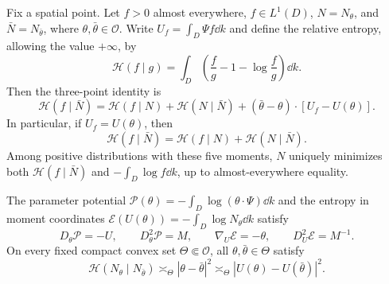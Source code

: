 \begin{proposition}\label{hyd:entropy-geometry}
 Fix a spatial point. Let $f>0$ almost everywhere, $f\in L^1(D)$,
 $N=N_\theta$, and $\bar N=N_{\bar\theta}$, where
 $\theta,\bar\theta\in\mathcal O$.
 Write $U_f=\int_D\Psi f\dd k$ and define the relative entropy, allowing
 the value $+\infty$, by
 \[
 \mathscr H(f\mid g)=\int_D\left(\frac f g-1-\log\frac f g\right)\dd k.
 \]
 Then the three-point identity is
 \begin{equation}\label{hyd:entropy-threepoint}
 \mathscr H(f\mid\bar N)
 =\mathscr H(f\mid N)+\mathscr H(N\mid\bar N)
       +(\bar\theta-\theta)\cdot[U_f-U(\theta)].
 \end{equation}
 In particular, if $U_f=U(\theta)$, then
 \begin{equation}\label{hyd:entropy-pythagoras}
 \mathscr H(f\mid\bar N)
       =\mathscr H(f\mid N)+\mathscr H(N\mid\bar N).
 \end{equation}
 Among positive distributions with these five moments, $N$ uniquely
 minimizes both $\mathscr H(f\mid\bar N)$ and
 $-\int_D\log f\dd k$, up to almost-everywhere equality.

 The parameter potential
 $\mathcal P(\theta)=-\int_D\log(\theta\cdot\Psi)\dd k$ and the entropy
 in moment coordinates
 $\mathcal E(U(\theta))=-\int_D\log N_\theta\dd k$ satisfy
 \begin{equation}\label{hyd:entropy-hessians}
 D_\theta\mathcal P=-U,\qquad D_\theta^2\mathcal P=M,
 \qquad \nabla_U\mathcal E=-\theta,\qquad D_U^2\mathcal E=M^{-1}.
 \end{equation}
 On every fixed compact convex set $\Theta\Subset\mathcal O$, all
 $\theta,\bar\theta\in\Theta$ satisfy
 \begin{equation}\label{hyd:entropy-comparison}
 \mathscr H(N_\theta\mid N_{\bar\theta})
 \asymp_\Theta|\theta-\bar\theta|^2
 \asymp_\Theta|U(\theta)-U(\bar\theta)|^2.
 \end{equation}
\end{proposition}

